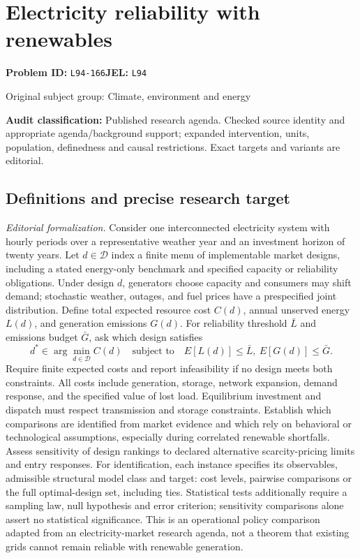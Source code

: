 \documentclass[11pt,a4paper]{article}
\begin{document}
\section*{Electricity reliability with renewables}
\textbf{Problem ID:} \texttt{L94-166}\quad \textbf{JEL:} \texttt{L94}\par
\label{problem:OP-0437}
\label{audited:ECON-069}
{\sffamily\small\color{muted}Original subject group: Climate, environment and energy\par}
\label{definitions:problem:30007719}
\textbf{Audit classification:} Published research agenda. Checked source identity and appropriate agenda/background support; expanded intervention, units, population, definedness and causal restrictions. Exact targets and variants are editorial.
\subsection*{Definitions and precise research target}
\textit{Editorial formalization.} Consider one interconnected electricity system with hourly periods over a representative weather year and an investment horizon of twenty years. Let \(d\in\mathcal D\) index a finite menu of implementable market designs, including a stated energy-only benchmark and specified capacity or reliability obligations. Under design \(d\), generators choose capacity and consumers may shift demand; stochastic weather, outages, and fuel prices have a prespecified joint distribution. Define total expected resource cost \(C(d)\), annual unserved energy \(L(d)\), and generation emissions \(G(d)\). For reliability threshold \(\bar L\) and emissions budget \(\bar G\), ask which design satisfies
\[d^*\in\arg\min_{d\in\mathcal D} C(d)\quad\text{subject to}\quad E[L(d)]\leq\bar L,\ E[G(d)]\leq\bar G.\]
Require finite expected costs and report infeasibility if no design meets both constraints. All costs include generation, storage, network expansion, demand response, and the specified value of lost load. Equilibrium investment and dispatch must respect transmission and storage constraints. Establish which comparisons are identified from market evidence and which rely on behavioral or technological assumptions, especially during correlated renewable shortfalls. Assess sensitivity of design rankings to declared alternative scarcity-pricing limits and entry responses. For identification, each instance specifies its observables, admissible structural model class and target: cost levels, pairwise comparisons or the full optimal-design set, including ties. Statistical tests additionally require a sampling law, null hypothesis and error criterion; sensitivity comparisons alone assert no statistical significance. This is an operational policy comparison adapted from an electricity-market research agenda, not a theorem that existing grids cannot remain reliable with renewable generation.
\end{document}
